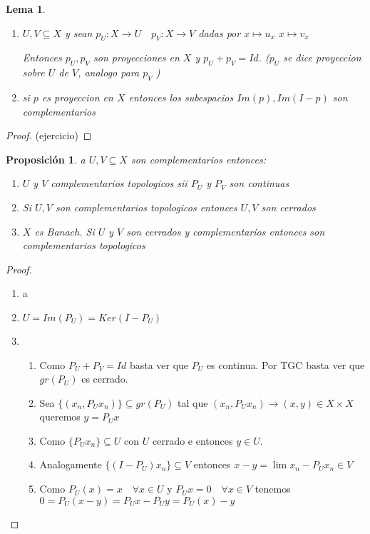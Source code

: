\documentclass[10pt]{extarticle}
\theoremstyle{break}
\newtheorem{lemma}[theorem]{Lema}
\newtheorem{proposition}{Proposición}
\theoremstyle{definition}
\begin{document}
\begin{lemma}
	\begin{enumerate}
		\item $U,V\subseteq X$ y sean $p_{U}:X\longrightarrow U \quad p_{V}:X\longrightarrow V$ dadas por $x\mapsto u_{x}$ $x\mapsto v_{x}$

			Entonces $p_{U},p_{V}$ son proyecciones en $X$ y $p_{U}+p_{V}=Id$. ($p_{U}$ se dice proyeccion sobre $U$ de $V$, analogo para $p_{V}$ )
		\item si $p$ es proyeccion en $X$ entonces los subespacios $Im(p),Im(I-p)$ son complementarios
	\end{enumerate}
\end{lemma}
\begin{proof}
	(ejercicio)
\end{proof}

\begin{proposition}
	a $U,V\subseteq X$ son complementarios entonces:
	\begin{enumerate}
		\item $U$ y $V$ complementarios topologicos sii $P_{U}$ y $P_{V}$ son continuas
		\item Si $U,V$ son complementarios topologicos entonces $U,V$ son cerrados
		\item $X$ es Banach. Si $U$ y $V$ son cerrados y complementarios entonces son complementarios topologicos 
	\end{enumerate}
\end{proposition}
\begin{proof}
	\begin{enumerate}
		\item a
		\item $U=Im(P_{U})=Ker(I-P_{U})$
		\item 
			\begin{enumerate}
				\item Como $ P_{U}+P_{V}=Id $ basta ver que $ P_{U} $ es continua. Por TGC basta ver que $ gr(P_{U}) $ es cerrado. 

				\item Sea $ \{( x_{n},P_{U}x_{n} ) \} \subseteq gr(P_{U})$ tal que $ (x_{n} ,P_{U}x_{n} )\longrightarrow (x,y)\in X\times X $ queremos $ y=P_{U}x $ 
				\item Como $ \{P_{U}x_{n} \}\subseteq U$ con $ U $ cerrado e entonces $ y\in U $. 
				\item Analogamente $ \{(I-P_{U})x_{n} \}\subseteq V $ entonces $ x-y=\lim x_{n} -P_{U}x_{n} \in V $  
				\item Como $ P_{U}(x)=x\quad \forall x\in U  $ y $ P_{U}x=0\quad \forall x\in V  $ tenemos $ 0=P_{U}(x-y)=P_{U}x-P_{U}y=P_{U}(x)-y $   
		\end{enumerate}	\end{enumerate}
\end{proof}
\end{document}
